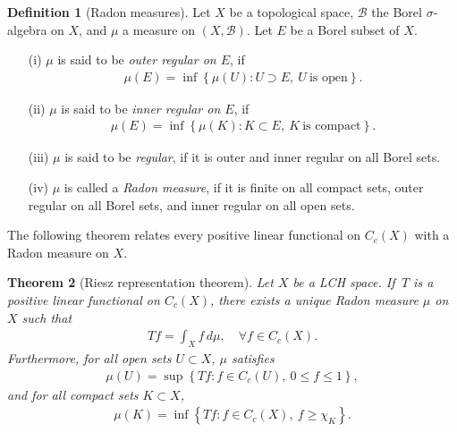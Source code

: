 \documentclass{article}
\numberwithin{equation}{section}
\newcommand{\scr}{\mathscr}
\theoremstyle{plain}
\newtheorem{theorem}{Theorem}[section]
\theoremstyle{definition}
\newtheorem{definition}[theorem]{Definition}
\begin{document}
\begin{definition}[Radon measures]
	Let $X$ be a topological space, $\scr{B}$ the Borel $\sigma$-algebra on $X$, and $\mu$ a measure on $(X,\mathscr{B})$. Let $E$ be a Borel subset of $X$.
	\begin{itemize}
		\item[(i)] $\mu$ is said to be \textit{outer regular on $E$}, if
		\begin{align*}
			\mu(E)=\inf\left\{\mu(U):U\supset E,\ U\ \text{is open}\right\}.
		\end{align*}
		\item[(ii)] $\mu$ is said to be \textit{inner regular on $E$}, if
		\begin{align*}
			\mu(E)=\inf\left\{\mu(K):K\subset E,\ K\ \text{is compact}\right\}.
		\end{align*}
		\item[(iii)] $\mu$ is said to be \textit{regular}, if it is outer and inner regular on all Borel sets.
		\item[(iv)] $\mu$ is called a \textit{Radon measure}, if it is finite on all compact sets, outer regular on all Borel sets, and inner regular on all open sets.
	\end{itemize}
\end{definition}

The following theorem relates every positive linear functional on $C_c(X)$ with a Radon measure on $X$.
\begin{theorem}[Riesz representation theorem]\label{rieszcc}
	Let $X$ be a LCH space. If $\,T$ is a positive linear functional on $C_c(X)$, there exists a unique Radon measure $\mu$ on $X$ such that
	\begin{align*}
		Tf=\int_X f\,d\mu,\quad\forall f\in C_c(X).
	\end{align*}
	Furthermore, for all open sets $U\subset X$, $\mu$ satisfies
	\begin{align*}
		\mu(U)=\sup\left\{Tf:f\in C_c(U),\ 0\leq f\leq 1\right\},
	\end{align*}
	and for all compact sets $K\subset X$,
	\begin{align*}
		\mu(K)=\inf\left\{Tf:f\in C_c(X),\ f\geq\chi_K\right\}.
	\end{align*}
\end{theorem}
\end{document}
